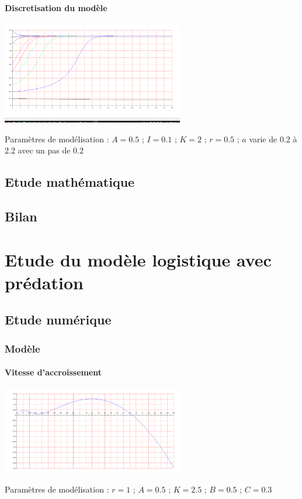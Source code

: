 \documentclass{article}
\begin{document}
\paragraph{Discretisation du modèle}
\begin{center}
\includegraphics[width=300px]{img/part1/TrajPop.png}
\end{center}
Paramètres de modélisation : $A=0.5$ ; $I=0.1$ ; $K=2$ ; $r=0.5$  ; $a$ varie de 0.2 à 2.2 avec un pas de 0.2
\paragraph{}

\newpage

\subsection{Etude mathématique}


\subsection{Bilan}
\paragraph{}

\newpage
\section{Etude du modèle logistique avec prédation}

\subsection{Etude numérique}

\subsubsection{Modèle}

\paragraph{Vitesse d'accroissement}
\begin{center}
\includegraphics[width=300px]{img/part2/Log.png}
\end{center}
Paramètres de modélisation : $r=1$ ; $A=0.5$ ; $K=2.5$ ; $B=0.5$ ; $C=0.3$
\end{document}
